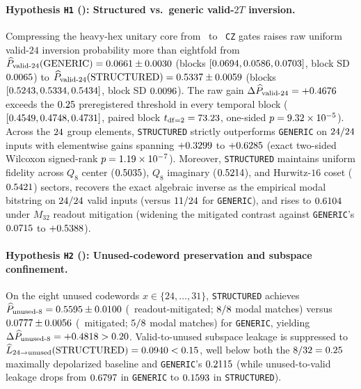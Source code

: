 \documentclass[aps,prx,twocolumn,superscriptaddress,nofootinbib]{revtex4-2}
\begin{document}
\paragraph{Hypothesis \texttt{H1} (\btHOneVerdict): Structured vs.\ generic valid-$2T$ inversion.}
Compressing the heavy-hex unitary core from \btGenCz\ to \btStructCz\ \texttt{CZ} gates raises raw uniform valid-$24$ inversion probability more than eightfold from $\widehat{P}_{\mathrm{valid\text{-}24}}(\mathrm{GENERIC}) = 0.0661 \pm 0.0030$ (blocks $[0.0694, 0.0586, 0.0703]$, block SD $0.0065$) to $\widehat{P}_{\mathrm{valid\text{-}24}}(\mathrm{STRUCTURED}) = 0.5337 \pm 0.0059$ (blocks $[0.5243, 0.5334, 0.5434]$, block SD $0.0096$). The raw gain $\Delta\widehat{P}_{\mathrm{valid\text{-}24}} = +0.4676$ exceeds the $0.25$ preregistered threshold in every temporal block ($[0.4549, 0.4748, 0.4731]$, paired block $t_{\mathrm{df}=2} = 73.23$, one-sided $p = 9.32 \times 10^{-5}$). Across the $24$ group elements, \texttt{STRUCTURED} strictly outperforms \texttt{GENERIC} on $24 / 24$ inputs with elementwise gains spanning $+0.3299$ to $+0.6285$ (exact two-sided Wilcoxon signed-rank $p = 1.19 \times 10^{-7}$). Moreover, \texttt{STRUCTURED} maintains uniform fidelity across $Q_8$ center ($0.5035$), $Q_8$ imaginary ($0.5214$), and Hurwitz-$16$ coset ($0.5421$) sectors, recovers the exact algebraic inverse as the empirical modal bitstring on $24 / 24$ valid inputs (versus $11 / 24$ for \texttt{GENERIC}), and rises to $0.6104$ under $M_{32}$ readout mitigation (widening the mitigated contrast against \texttt{GENERIC}'s $0.0715$ to $+0.5388$).

\paragraph{Hypothesis \texttt{H2} (\btHTwoVerdict): Unused-codeword preservation and subspace confinement.}
On the eight unused codewords $x \in \{24,\dots,31\}$, \texttt{STRUCTURED} achieves $\widehat{P}_{\mathrm{unused\text{-}8}} = 0.5595 \pm 0.0100$ (\btPUnusedStructMit\ readout-mitigated; $8 / 8$ modal matches) versus $0.0777 \pm 0.0056$ (\btPUnusedGenMit\ mitigated; $5 / 8$ modal matches) for \texttt{GENERIC}, yielding $\Delta\widehat{P}_{\mathrm{unused\text{-}8}} = +0.4818 > 0.20$. Valid-to-unused subspace leakage is suppressed to $\widehat{L}_{24\to\mathrm{unused}}(\mathrm{STRUCTURED}) = 0.0940 < 0.15$, well below both the $8/32 = 0.25$ maximally depolarized baseline and \texttt{GENERIC}'s $0.2115$ (while unused-to-valid leakage drops from $0.6797$ in \texttt{GENERIC} to $0.1593$ in \texttt{STRUCTURED}).
\end{document}
